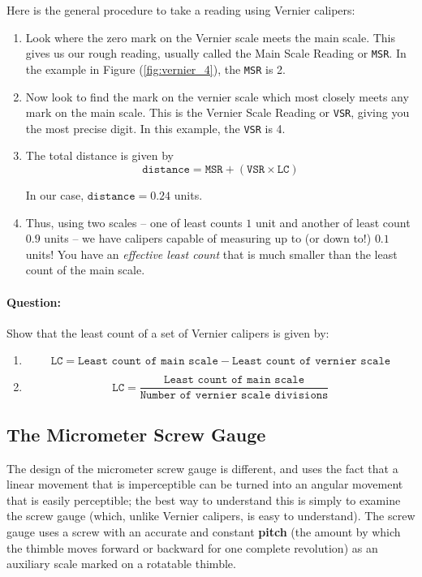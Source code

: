 Here is the general procedure to take a reading using Vernier calipers:

\begin{enumerate}
    \item Look where the zero mark on the Vernier scale meets the main scale. This gives us our rough reading, usually called the Main Scale Reading or \texttt{MSR}. In the example in Figure (\ref{fig:vernier_4}), the \texttt{MSR} is 2.
    
    \item Now look to find the mark on the vernier scale which most closely meets any mark on the main scale. This is the Vernier Scale Reading or \texttt{VSR}, giving you the most precise digit. In this example, the \texttt{VSR} is 4.
    
    \item The total distance is given by 
    $$\texttt{distance} = \texttt{MSR} + \left(\texttt{VSR}\times\texttt{LC}\right)$$
    
    In our case, $\texttt{distance} = 0.24$ units.
    
    \item Thus, using two scales -- one of least counts $1$ unit and another of least count $0.9$ units -- we have calipers capable of measuring up to (or down to!) $0.1$ units! You have an \textit{effective least count} that is much smaller than the least count of the main scale. 
\end{enumerate}

\begin{question}
\paragraph{Question:} Show that the least count of a set of Vernier calipers is given by:
\begin{enumerate}
    \item $$\texttt{LC} = \texttt{Least count of main scale} - \texttt{Least count of vernier scale}$$
    \item $$\texttt{LC} = \frac{\texttt{Least count of main scale}}{\texttt{Number of vernier scale divisions}}$$
\end{enumerate}
\end{question}

\subsection{The Micrometer Screw Gauge}

The design of the micrometer screw gauge is different, and uses the fact that a linear movement that is imperceptible can be turned into an angular movement that is easily perceptible; the best way to understand this is simply to examine the screw gauge (which, unlike Vernier calipers, is easy to understand). The screw gauge uses a screw with an accurate and constant \textbf{pitch} (the amount by which the thimble moves forward or backward for one complete revolution) as an auxiliary scale marked on a rotatable thimble.  


